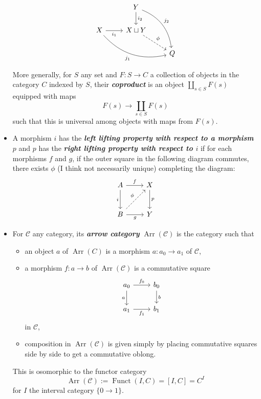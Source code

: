\documentclass{article}
\numberwithin{equation}{section}
\newcommand{\Cc}{\mathcal{C}}
\DeclareMathOperator{\Arr}{Arr}
\DeclareMathOperator{\Funct}{Funct}
\begin{document}
\begin{defn}
\begin{itemize}
	\[\begin{tikzcd}
	&Y\arrow[d,"i_2"]\arrow[ddr,bend left,"j_2"]\\
	X\arrow[r,"i_1",swap]\arrow[drr,bend right,swap,"j_1"]&X\sqcup Y\arrow[dr,dashed,"\phi"]\\
	&&Q
\end{tikzcd}\]
\begin{remark}
	More generally, for $S$ any set and $F:S\to C$ a collection of objects in the category $C$ indexed by $S$, their \textbf{\textit{coproduct}} is an object $\coprod_{s\in S}F(s)$ equipped with maps
	\[F(s)\to\coprod_{s\in S}F(s)\]
	such that this is universal among objects with maps from $F(s)$.
\end{remark}
\item A morphism $i$ has the \textbf{\textit{left lifting property with respect to a morphism $p$}} and $p$ has the \textbf{\textit{right lifting property with respect to $i$}} if for each morphisms $f$ and $g$, if the outer square in the following diagram commutes, there exists $\phi$ (I think not necessarily unique) completing the diagram:
\[\begin{tikzcd}[row sep=large]
	A\arrow[r,"f"]\arrow[d,"i",swap]&X\arrow[d,"p"]\\
	B\arrow[r,"g",swap]\arrow[ur,dashed,"\phi"]&Y
\end{tikzcd}\]

\item For $\Cc$ any category, its \textbf{\textit{arrow category}} $\Arr(\Cc)$ is the category such that
\begin{itemize}
	\item an object $a$ of $\Arr(C)$ is a morphism $a:a_0\to a_1$ of $\Cc$,
	\item a morphism $f:a\to b$ of $\Arr(\Cc)$ is a commutative square
	\[\begin{tikzcd}
		a_0\arrow[r,"f_0"]\arrow[d,swap,"a"]&b_0\arrow[d,"b"]\\
		a_1\arrow[r,swap,"f_1"]&b_1
	\end{tikzcd}\]
	in $\Cc$,
	\item composition in $\Arr(\Cc)$ is given simply by placing commutative squares side by side to get a commutative oblong.
\end{itemize}
This is osomorphic to the functor category
\[\Arr(\Cc):=\Funct(I,C)=[I,C]=C^I\]
for $I$ the interval category $\{0\to 1\}$.
	\end{itemize}
\end{defn}
\end{document}
